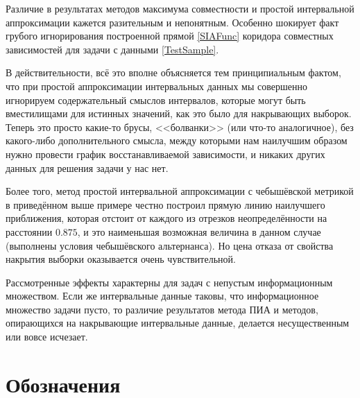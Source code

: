 \documentclass[a5paper,openany]{book}
\begin{document}
Различие в результатах методов максимума совместности и простой интервальной 
аппроксимации кажется разительным и непонятным. Особенно шокирует факт 
грубого игнорирования построенной прямой \eqref{SIAFunc} коридора совместных 
зависимостей для задачи с данными \eqref{TestSample}. 
  
В действительности, всё это вполне объясняется тем принципиальным фактом, 
что при простой аппроксимации интервальных данных мы совершенно игнорируем 
содержательный смыслов интервалов, которые могут быть вместилищами для истинных 
значений, как это было для накрывающих выборок. Теперь это просто какие-то брусы, 
<<болванки>> (или что-то аналогичное), без какого-либо дополнительного смысла, 
между которыми нам наилучшим образом нужно провести график восстанавливаемой 
зависимости, и никаких других данных для решения задачи у нас нет. 
  
Более того, метод простой интервальной аппроксимации с чебышёвской метрикой 
в приведённом выше примере честно построил прямую линию наилучшего приближения, 
которая отстоит от каждого из отрезков неопределённости на расстоянии $0.875$, и 
это наименьшая возможная величина в данном случае (выполнены условия чебышёвского 
альтернанса). Но цена отказа от свойства накрытия выборки оказывается очень 
чувствительной. 
  
Рассмотренные эффекты характерны для задач с непустым информационным множеством. 
Если же интервальные данные таковы, что информационное множество задачи пусто, 
то различие результатов метода ПИА и методов, опирающихся на накрывающие 
интервальные данные, делается несущественным или вовсе исчезает. 
  
  
\newpage
  
\chapter*{Обозначения}
  
\end{document}

